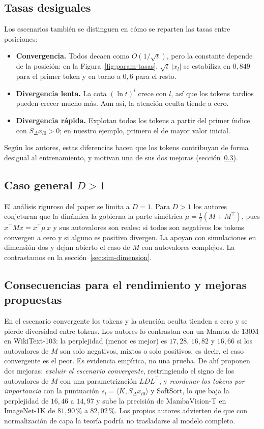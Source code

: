 \subsection{Tasas desiguales}
\label{sec:din-tasas}

Los escenarios también se distinguen en cómo se reparten las tasas entre posiciones:
\begin{itemize}[nosep]
  \item \textbf{Convergencia.} Todos decaen como $O(1/\sqrt{t})$, pero la constante depende de la posición: en la Figura~\ref{fig:param-tasas}, $\sqrt{t}\,|x_l|$ se estabiliza en $0{,}849$ para el primer token y en torno a $0{,}6$ para el resto.
  \item \textbf{Divergencia lenta.} La cota $(\ln t)^{l}$ crece con $l$, así que los tokens tardíos pueden crecer mucho más. Aun así, la atención oculta tiende a cero.
  \item \textbf{Divergencia rápida.} Explotan todos los tokens a partir del primer índice con $S_\Delta x_{l0}>0$; en nuestro ejemplo, primero el de mayor valor inicial.
\end{itemize}
Según los autores, estas diferencias hacen que los tokens contribuyan de forma desigual al entrenamiento, y motivan una de sus dos mejoras (sección~\ref{sec:din-mejoras}).

\subsection{Caso general \texorpdfstring{$D>1$}{D>1}}
\label{sec:din-general}

El análisis riguroso del paper se limita a $D=1$. Para $D>1$ los autores conjeturan que la dinámica la gobierna la parte simétrica $\mu=\tfrac12(M+M^{\top})$, pues $x^{\top}Mx=x^{\top}\mu\,x$ y sus autovalores son reales: si todos son negativos los tokens convergen a cero y si alguno es positivo divergen. La apoyan con simulaciones en dimensión dos y dejan abierto el caso de $M$ con autovalores complejos. La contrastamos en la sección~\ref{sec:sim-dimension}.

\subsection{Consecuencias para el rendimiento y mejoras propuestas}
\label{sec:din-mejoras}

En el escenario convergente los tokens y la atención oculta tienden a cero y se pierde diversidad entre tokens. Los autores lo contrastan con un Mamba de 130M en WikiText-103: la perplejidad (menor es mejor) es $17{,}28$, $16{,}82$ y $16{,}66$ si los autovalores de $M$ son solo negativos, mixtos o solo positivos, es decir, el caso convergente es el peor. Es evidencia empírica, no una prueba. De ahí proponen dos mejoras: \emph{excluir el escenario convergente}, restringiendo el signo de los autovalores de $M$ con una parametrización $LDL^{\top}$, y \emph{reordenar los tokens por importancia} con la puntuación $s_l=\langle K,S_\Delta x_{l0}\rangle$ y SoftSort, lo que baja la perplejidad de $16{,}46$ a $14{,}97$ y sube la precisión de MambaVision-T en ImageNet-1K de $81{,}90\,\%$ a $82{,}02\,\%$. Los propios autores advierten de que con normalización de capa la teoría podría no trasladarse al modelo completo.
